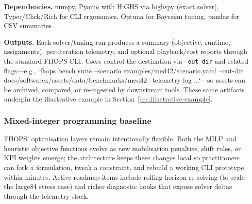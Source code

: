 \textbf{Dependencies.} numpy, Pyomo with HiGHS via highspy (exact solver), Typer/Click/Rich for CLI ergonomics, Optuna for Bayesian tuning, pandas for CSV summaries.

\textbf{Outputs.} Each solver/tuning run produces a summary (objective, runtime, assignments), per-iteration telemetry, and optional playback/cost reports through the standard FHOPS CLI. Users control the destination via \texttt{--out-dir} and related flags—e.g., `fhops bench suite --scenario examples/med42/scenario.yaml --out-dir docs/softwarex/assets/data/benchmarks/med42 --telemetry-log ...`—so assets can be archived, compared, or re-ingested by downstream tools. These same artifacts underpin the illustrative example in Section~\ref{sec:illustrative-example}.

\subsubsection*{Mixed-integer programming baseline}


FHOPS’ optimisation layers remain intentionally flexible. Both the MILP and heuristic objective functions evolve as new mobilisation penalties, shift rules, or KPI weights emerge; the architecture keeps these changes local so practitioners can fork a formulation, tweak a constraint, and rebuild a working CLI prototype within minutes. Active roadmap items include rolling-horizon re-solving (to scale the large84 stress case) and richer diagnostic hooks that expose solver deltas through the telemetry stack.


